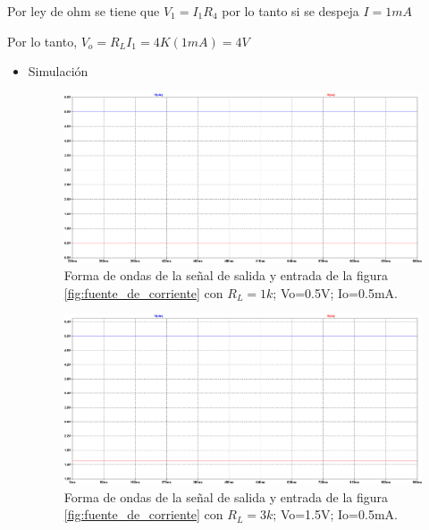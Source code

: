 \begin{enumerate}[label=\textbf{\arabic*.}, font=\bfseries]
\begin{itemize}
            Por ley de ohm se tiene que $V_1=I_1R_4$ por lo tanto si se despeja $I=1mA$

            Por lo tanto, $V_o=R_LI_1=4K(1mA)=4V$
                
            \begin{itemize}
                \item Simulación

                    \begin{figure}[H]
                      \centering
                      \renewcommand{\figurename}{Gráfica}
                      \setcounter{figure}{3}
                      \includegraphics[width=\textwidth]{Imagenes/sim_fuente.png}
                      \caption{Forma de ondas de la señal de salida y entrada de la figura \ref{fig:fuente_de_corriente} con $R_L=1k$; Vo=0.5V; Io=0.5mA.}
                      \label{fig:sim_fuente}
                    \end{figure}
                    \begin{figure}[H]
                      \centering
                      \renewcommand{\figurename}{Gráfica}
                      \includegraphics[width=\textwidth]{Imagenes/sim_fuente2.png}
                      \caption{Forma de ondas de la señal de salida y entrada de la figura \ref{fig:fuente_de_corriente} con $R_L=3k$; Vo=1.5V; Io=0.5mA.}
                      \label{fig:sim_fuente2}
                    \end{figure}


\end{itemize}
\end{itemize}
\end{enumerate}
